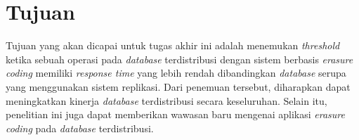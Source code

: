 \section{Tujuan}
\label{sec:tujuans}

Tujuan yang akan dicapai untuk tugas akhir ini adalah menemukan \textit{threshold} ketika sebuah operasi pada \textit{database} terdistribusi dengan sistem berbasis \textit{erasure coding} memiliki \textit{response time} yang lebih rendah dibandingkan \textit{database} serupa yang menggunakan sistem replikasi. Dari penemuan tersebut, diharapkan dapat meningkatkan kinerja \textit{database} terdistribusi secara keseluruhan. Selain itu, penelitian ini juga dapat memberikan wawasan baru mengenai aplikasi \textit{erasure coding} pada \textit{database} terdistribusi.
